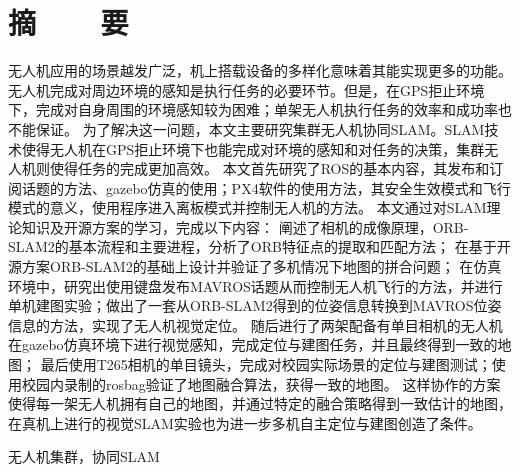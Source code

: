 

\renewcommand{\baselinestretch}{1.5}
\fontsize{12pt}{13pt} \selectfont

\chapter*{摘~~~~要}

\vspace{1em}


无人机应用的场景越发广泛，机上搭载设备的多样化意味着其能实现更多的功能。
无人机完成对周边环境的感知是执行任务的必要环节。但是，在GPS拒止环境下，完成对自身周围的环境感知较为困难；单架无人机执行任务的效率和成功率也不能保证。
为了解决这一问题，本文主要研究集群无人机协同SLAM。SLAM技术使得无人机在GPS拒止环境下也能完成对环境的感知和对任务的决策，集群无人机则使得任务的完成更加高效。
本文首先研究了ROS的基本内容，其发布和订阅话题的方法、gazebo仿真的使用；PX4软件的使用方法，其安全生效模式和飞行模式的意义，使用程序进入离板模式并控制无人机的方法。
本文通过对SLAM理论知识及开源方案的学习，完成以下内容：
阐述了相机的成像原理，ORB-SLAM2的基本流程和主要进程，分析了ORB特征点的提取和匹配方法；
在基于开源方案ORB-SLAM2的基础上设计并验证了多机情况下地图的拼合问题；
在仿真环境中，研究出使用键盘发布MAVROS话题从而控制无人机飞行的方法，并进行单机建图实验；做出了一套从ORB-SLAM2得到的位姿信息转换到MAVROS位姿信息的方法，实现了无人机视觉定位。
随后进行了两架配备有单目相机的无人机在gazebo仿真环境下进行视觉感知，完成定位与建图任务，并且最终得到一致的地图；
最后使用T265相机的单目镜头，完成对校园实际场景的定位与建图测试；使用校园内录制的rosbag验证了地图融合算法，获得一致的地图。
这样协作的方案使得每一架无人机拥有自己的地图，并通过特定的融合策略得到一致估计的地图，在真机上进行的视觉SLAM实验也为进一步多机自主定位与建图创造了条件。

\vspace{0.1in}
 无人机集群，协同SLAM


﻿﻿


